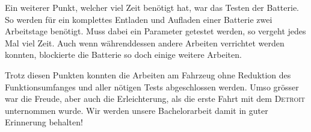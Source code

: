 Ein weiterer Punkt, welcher viel Zeit benötigt hat, war das Testen der Batterie. So werden für ein komplettes Entladen und Aufladen einer Batterie zwei Arbeitstage benötigt. Muss dabei ein Parameter getestet werden, so vergeht jedes Mal viel Zeit. Auch wenn währenddessen andere Arbeiten verrichtet werden konnten, blockierte die Batterie so doch einige weitere Arbeiten.

Trotz diesen Punkten konnten die Arbeiten am Fahrzeug ohne Reduktion des Funktionsumfanges und aller nötigen Tests abgeschlossen werden. Umso grösser war die Freude, aber auch die Erleichterung, als die erste Fahrt mit dem \textsc{Detroit} unternommen wurde. Wir werden unsere Bachelorarbeit damit in guter Erinnerung behalten!